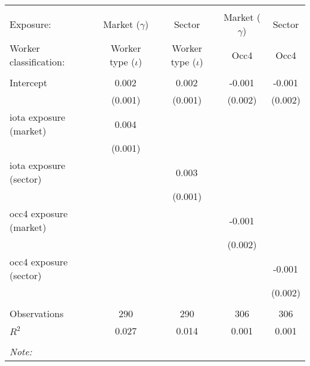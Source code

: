 \begin{tabular}{@{\extracolsep{5pt}}lcccc}
\\[-1.8ex]\hline
\hline \\[-1.8ex]
\hline \\[-1.8ex]
 Exposure: & Market ($\gamma$) & Sector & Market ($\gamma$) & Sector \\
 Worker classification: & Worker type ($\iota$) & Worker type ($\iota$) & Occ4 & Occ4 \\
 \hline &  &  &  &  \\
 Intercept & 0.002$^{}$ & 0.002$^{}$ & -0.001$^{}$ & -0.001$^{}$ \\
  & (0.001) & (0.001) & (0.002) & (0.002) \\
 iota exposure (market) & 0.004$^{}$ & & & \\
  & (0.001) & & & \\
 iota exposure (sector) & & 0.003$^{}$ & & \\
  & & (0.001) & & \\
 occ4 exposure (market) & & & -0.001$^{}$ & \\
  & & & (0.002) & \\
 occ4 exposure (sector) & & & & -0.001$^{}$ \\
  & & & & (0.002) \\
\hline \\[-1.8ex]
 Observations & 290 & 290 & 306 & 306 \\
 $R^2$ & 0.027 & 0.014 & 0.001 & 0.001 \\
\hline
\hline \\[-1.8ex]
\textit{Note:}\end{tabular}